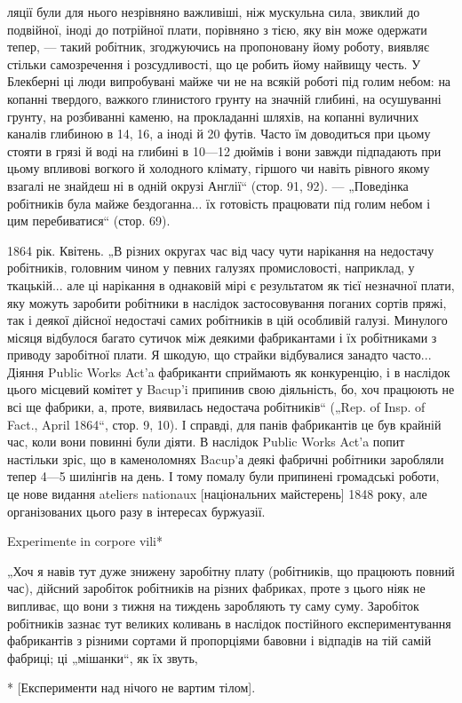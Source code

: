 ляції були для нього незрівняно важливіші, ніж мускульна сила,
звиклий до подвійної, іноді до потрійної плати, порівняно з тією,
яку він може одержати тепер, — такий робітник, згоджуючись
на пропоновану йому роботу, виявляє стільки самозречення
і розсудливості, що це робить йому найвищу честь. У Блекберні
ці люди випробувані майже чи не на всякій роботі під голим
небом: на копанні твердого, важкого глинистого грунту на
значній глибині, на осушуванні грунту, на розбиванні каменю,
на прокладанні шляхів, на копанні вуличних каналів глибиною
в 14, 16, а іноді й 20 футів. Часто їм доводиться при цьому
стояти в грязі й воді на глибині в 10—12 дюймів і вони завжди
підпадають при цьому впливові вогкого й холодного клімату,
гіршого чи навіть рівного якому взагалі не знайдеш ні в одній
окрузі Англії“ (стор. 91, 92). — „Поведінка робітників була майже
бездоганна... їх готовість працювати під голим небом і цим
перебиватися“ (стор. 69).

1864 рік. Квітень. „В різних округах час від часу чути нарікання
на недостачу робітників, головним чином у певних галузях
промисловості, наприклад, у ткацькій... але ці нарікання в однаковій
мірі є результатом як тієї незначної плати, яку можуть заробити
робітники в наслідок застосовування поганих сортів пряжі,
так і деякої дійсної недостачі самих робітників в цій особливій
галузі. Минулого місяця відбулося багато сутичок між деякими
фабрикантами і їх робітниками з приводу заробітної плати.
Я шкодую, що страйки відбувалися занадто часто... Діяння
Public Works Act’a фабриканти сприймають як конкуренцію,
і в наслідок цього місцевий комітет у Bacup’i припинив свою
діяльність, бо, хоч працюють не всі ще фабрики, а, проте, виявилась
недостача робітників“ („Rep. of Insp. of Fact., April 1864“,
стор. 9, 10). І справді, для панів фабрикантів це був крайній
час, коли вони повинні були діяти. В наслідок Public Works
Act’a попит настільки зріс, що в каменоломнях Bacup’а деякі
фабричні робітники заробляли тепер 4—5 шилінгів на день.
І тому помалу були припинені громадські роботи, це нове видання
ateliers nationaux [національних майстерень] 1848 року,
але організованих цього разу в інтересах буржуазії.

Experimente in corpore vili*

„Хоч я навів тут дуже знижену заробітну плату (робітників,
що працюють повний час), дійсний заробіток робітників на
різних фабриках, проте з цього ніяк не випливає, що вони
з тижня на тиждень заробляють ту саму суму. Заробіток робітників
зазнає тут великих коливань в наслідок постійного експериментування
фабрикантів з різними сортами й пропорціями бавовни
і відпадів на тій самій фабриці; ці „мішанки“, як їх звуть,

* [Експерименти над нічого не вартим тілом].
